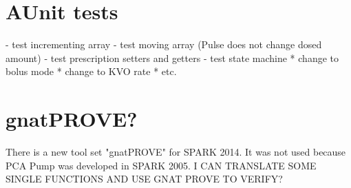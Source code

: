 \section{AUnit tests}
\label{verification:aunit}
- test incrementing array
- test moving array (Pulse does not change dosed amount)
- test prescription setters and getters
- test state machine
	* change to bolus mode
	* change to KVO rate
	* etc.



\section{gnatPROVE?}
\label{verification:gnatprove}

There is a new tool set "gnatPROVE" for SPARK 2014. It was not used because PCA Pump was developed in SPARK 2005.
I CAN TRANSLATE SOME SINGLE FUNCTIONS AND USE GNAT PROVE TO VERIFY?
